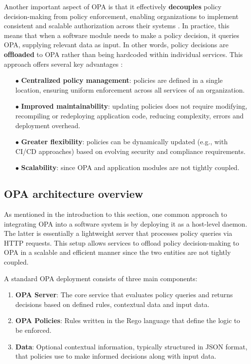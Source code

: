 Another important aspect of OPA is that it effectively \textbf{decouples} policy decision-making from policy enforcement, enabling organizations to implement consistent and scalable authorization across their systems \cite{opa_docs}.
In practice, this means that when a software module needs to make a policy decision, it queries OPA, supplying relevant data as input. In other words, policy decisions are \textbf{offloaded} to OPA rather than being hardcoded within individual services. This approach offers several key advantages \cite{opa_docs}:
\begin{itemize}[itemsep=0.2pt, topsep=1pt]
  \item[$\bullet$] \textbf{Centralized policy management}: policies are defined in a single location, ensuring uniform enforcement across all services of an organization.
  \item[$\bullet$] \textbf{Improved maintainability}: updating policies does not require modifying, recompiling or redeploying application code, reducing complexity, errors and deployment overhead.
  \item[$\bullet$] \textbf{Greater flexibility}: policies can be dynamically updated (e.g., with CI/CD approaches) based on evolving security and compliance requirements. 
  \item[$\bullet$] \textbf{Scalability}: since OPA and application modules are not tightly coupled.
\end{itemize} 

\subsection{OPA architecture overview}

As mentioned in the introduction to this section, one common approach to integrating OPA into a software system is by deploying it as a host-level daemon. The latter is essentially a lightweight server that processes policy queries via HTTP requests. This setup allows services to offload policy decision-making to OPA in a scalable and efficient manner since the two entities are not tightly coupled.

A standard OPA deployment consists of three main components:

\begin{enumerate}[itemsep=0.2pt, topsep=1pt]
  \item \textbf{OPA Server}: The core service that evaluates policy queries and returns decisions based on defined rules, contextual data and input data.
  \item \textbf{OPA Policies}: Rules written in the Rego language that define the logic to be enforced.
  \item \textbf{Data}: Optional contextual information, typically structured in JSON format, that policies use to make informed decisions along with input data.
\end{enumerate}

